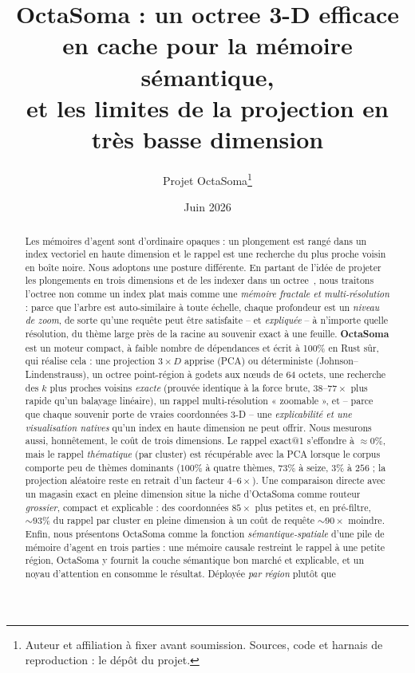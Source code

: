 \documentclass[11pt]{article}
\title{\textbf{OctaSoma} : un octree 3-D efficace en cache pour la mémoire sémantique,\\
et les limites de la projection en très basse dimension}
\author{Projet OctaSoma\thanks{Auteur et affiliation à fixer avant
soumission. Sources, code et harnais de reproduction : le dépôt du projet.}}
\date{Juin 2026}
\begin{document}
\maketitle

\begin{abstract}
Les mémoires d'agent sont d'ordinaire opaques : un plongement est rangé dans un
index vectoriel en haute dimension et le rappel est une recherche du plus proche
voisin en boîte noire. Nous adoptons une posture différente. En partant de l'idée de
projeter les plongements en trois dimensions et de les indexer dans un
octree~\cite{octreerag}, nous traitons l'octree non comme un index plat mais comme
une \emph{mémoire fractale et multi-résolution} : parce que l'arbre est
auto-similaire à toute échelle, chaque profondeur est un \emph{niveau de zoom}, de
sorte qu'une requête peut être satisfaite -- et \emph{expliquée} -- à n'importe
quelle résolution, du thème large près de la racine au souvenir exact à une feuille.
\textbf{OctaSoma} est un moteur compact, à faible nombre de dépendances et écrit à
100\% en Rust sûr, qui réalise cela : une projection $3\times D$ apprise (PCA) ou
déterministe (Johnson--Lindenstrauss), un octree point-région à godets aux n\oe{}uds
de 64 octets, une recherche des $k$ plus proches voisins \emph{exacte} (prouvée
identique à la force brute, $38$--$77\times$ plus rapide qu'un balayage linéaire), un
rappel multi-résolution « zoomable », et -- parce que chaque souvenir porte de
vraies coordonnées 3-D -- une \emph{explicabilité et une visualisation natives}
qu'un index en haute dimension ne peut offrir. Nous mesurons aussi, honnêtement, le
coût de trois dimensions. Le rappel exact@1 s'effondre à ${\approx}0\%$, mais le
rappel \emph{thématique} (par cluster) est récupérable avec la PCA lorsque le corpus
comporte peu de thèmes dominants ($100\%$ à quatre thèmes, $73\%$ à seize, $3\%$ à
$256$ ; la projection aléatoire reste en retrait d'un facteur $4$--$6\times$). Une
comparaison directe avec un magasin exact en pleine dimension situe la niche
d'OctaSoma comme routeur \emph{grossier}, compact et explicable : des coordonnées
$85\times$ plus petites et, en pré-filtre, ${\sim}93\%$ du rappel par cluster en
pleine dimension à un coût de requête ${\sim}90\times$ moindre. Enfin, nous
présentons OctaSoma comme la fonction \emph{sémantique-spatiale} d'une pile de
mémoire d'agent en trois parties : une mémoire causale restreint le rappel à une
petite région, OctaSoma y fournit la couche sémantique bon marché et explicable, et
un noyau d'attention en consomme le résultat. Déployée \emph{par région} plutôt que

\end{abstract}
\end{document}
